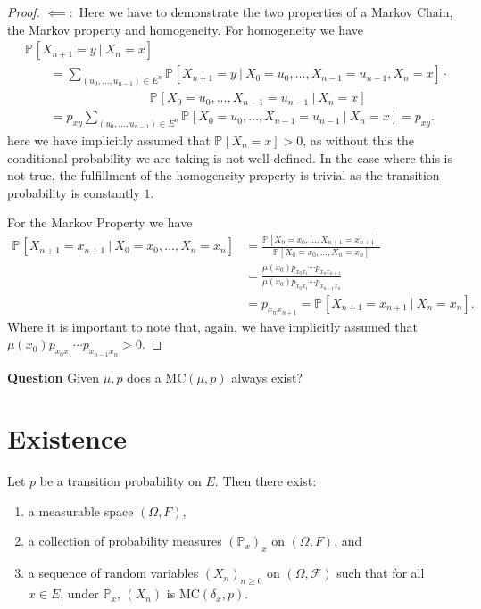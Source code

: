 \begin{proof}
{$\impliedby:$ Here we have to demonstrate the two properties of a Markov Chain, the Markov property and homogeneity. For homogeneity we have
\begin{align}
&	\mathbb{P}_{} \left[ X_{n+1} = y \ | \ X_n =x \right] \\
&\qquad = \sum_{(u_0, \ldots ,u_{n-1}) \in E^n}^{} \mathbb{P}_{} \left[ X_{n+1}=y \ | \ X_0=u_0, \ldots ,X_{n-1}=u_{n-1}, X_n =x \right] \cdot \\
& \qquad \qquad \qquad \qquad \qquad  \mathbb{P}_{} \left[ X_0=u_0, \ldots , X_{n-1}=u_{n-1} \ | \ X_n = x \right] \\
&\qquad = p_{xy} \sum_{(u_0, \ldots ,u_{n-1})\in E^n}^{} \mathbb{P}_{} \left[ X_0=u_0, \ldots ,X_{n-1}=u_{n-1} \ | \ X_n = x \right] = p_{xy}
.\end{align}
here we have implicitly assumed that $\mathbb{P}_{} \left[ X_n = x \right] > 0$, as without this the conditional probability we are taking is not well-defined. In the case where this is not true, the fulfillment of the homogeneity property is trivial as the transition probability is constantly $1$.

For the Markov Property we have
\begin{align}
	\mathbb{P}_{} \left[ X_{n+1} = x_{n+1} \ | \ X_0 =x_0, \ldots ,X_n=x_n \right] &=
		\frac{\mathbb{P}_{} \left[ X_0=x_0, \ldots , X_{n+1}=x_{n+1} \right] }
		{\mathbb{P}_{} \left[ X_0=x_0 , \ldots , X_{n}=x_{n} \right]} \\
	&= \frac{\mu(x_0)p_{x_0 x_1}  \cdots  p_{x_{n}x_{n+1}}} {\mu(x_0)p_{x_0x_1} \cdots p_{x_{n-1}x_{n}}} \\
	&= p_{x_n x_{n+1}} = \mathbb{P}_{} \left[ X_{n+1} = x_{n+1} \ | \ X_n=x_n \right] 
.\end{align}
Where it is important to note that, again,  we have implicitly assumed that \newline $\mu(x_0)p_{x_0x_1} \cdots p_{x_{n-1}x_n}>0$. 
}
\end{proof}


\textbf{Question} Given $\mu, p$ does a $ \textrm{MC}(\mu, p)$ always exist?

\section{Existence}

\begin{theorem}
	Let $p$ be a transition probability on $E$. Then there exist:
\begin{enumerate}
	\item a measurable space $(\Omega, F)$,
	\item a collection of probability measures $(\mathbb{P}_x)_{x}$ on $(\Omega, F)$, and
	\item a sequence of random variables $(X_n)_{n \geq 0}$ on $(\Omega, \mathcal{F})$ such that for all $x\in E$, under $\mathbb{P}_x$, $(X_n)$ is  $ \textrm{MC}(\delta_x, p)$.
\end{enumerate}

\end{theorem}


